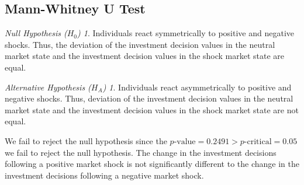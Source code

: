 \documentclass[12pt, a4paper]{article}
\theoremstyle{remark}
\newtheorem*{nullhypothesis}{Null Hypothesis ($H_0$)}
\newtheorem*{alternativehypothesis}{Alternative Hypothesis ($H_A$)}
\begin{document}
\subsection{Mann-Whitney U Test}

\begin{nullhypothesis}
Individuals react symmetrically to positive and negative shocks. Thus, the deviation of the investment decision values in the neutral market state and the investment decision values in the shock market state are equal.
\end{nullhypothesis}

\begin{alternativehypothesis}
Individuals react asymmetrically to positive and negative shocks. Thus, deviation of the investment decision values in the neutral market state and the investment decision values in the shock market state are not equal.
\end{alternativehypothesis}

We fail to reject the null hypothesis since the $p\text{-value} = 0.2491 > p\text{-critical} = 0.05$ we fail to reject the null hypothesis. The change in the investment decisions following a positive market shock is not significantly different to the change in the investment decisions following a negative market shock.
\end{document}

